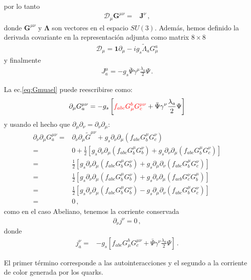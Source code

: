 \begin{frame}
por lo tanto
\begin{align}
  \mathcal{D}_\mu{\boldsymbol{G}}^{\mu\nu}
=&\boldsymbol{J}^{\nu}\,,
\end{align}
donde $\boldsymbol{G}^{\mu\nu}$ y $\boldsymbol{\Lambda}$ son vectores en el espacio $SU(3)$.
Además, hemos definido la derivada covariante en la representación adjunta como matrix  $8\times8$ 
\begin{align}
  \mathcal{D}_{\mu}=\mathbf{1}\partial_{\mu}-i g_s \widetilde{\Lambda}_a G_{\mu}^{a} 
\end{align}
y finalmente
\begin{align}
J^\mu_a = -g_s\bar{\Psi}\gamma^\mu\frac{\lambda_a}{2}\Psi\,.
\end{align}

La ec.\eqref{eq:Gmuael} puede reescribirse como:
\begin{align}
  \partial_\mu G^{\mu\nu}_a=-g_s\left[{\color{red}f_{abc}G^b_\mu G^{\mu\nu}_c}+\bar{\Psi}\gamma^\nu\frac{\lambda_a}{2}\Psi  \right]
\end{align}
y usando el hecho que $\partial_\mu\partial_\nu=\partial_\nu\partial_\mu$:
\begin{align}
  \partial_\nu\partial_\mu G^{\mu\nu}_a=&\partial_\nu\partial_\mu\widetilde{G}^{\mu\nu}+g_s\partial_\nu\partial_\mu\left(f_{abc}G^\mu_bG^\nu_c\right)\nonumber\\
=&0+\frac{1}{2}\left[g_s\partial_\nu\partial_\mu\left(f_{abc}G^\mu_bG^\nu_b\right)+g_s\partial_\nu\partial_\mu\left(f_{abc}G^\mu_bG^\nu_c\right)\right]\nonumber\\
=&\frac{1}{2}\left[g_s\partial_\nu\partial_\mu\left(f_{abc}G^\mu_bG^\nu_b\right)+g_s\partial_\mu\partial_\nu\left(f_{abc}G^\mu_bG^\nu_c\right)\right]\nonumber\\
=&\frac{1}{2}\left[g_s\partial_\nu\partial_\mu\left(f_{abc}G^\mu_bG^\nu_b\right)+g_s\partial_\nu\partial_\mu\left(f_{acb}G^\nu_cG^\mu_b\right)\right]\nonumber\\
=&\frac{1}{2}\left[g_s\partial_\nu\partial_\mu\left(f_{abc}G^\mu_bG^\nu_b\right)-g_s\partial_\mu\partial_\nu\left(f_{abc}G^\mu_bG^\nu_c\right)\right]\nonumber\\
=&0\,,
\end{align}
como en el caso Abeliano, tenemos la corriente conservada
\begin{align}
  \partial_\nu j^\nu=0\,,
\end{align}
donde
\begin{align}
\label{eq:jnuqcd}
  j^\nu_a=&-g_s\left[f_{abc}G^b_\mu G^{\mu\nu}_c+\bar{\Psi}\gamma^\nu\frac{\lambda_a}{2}\Psi  \right]\,.
\end{align}

El primer término corresponde a las autointeracciones y el segundo a la corriente de color generada por los quarks.

\end{frame}


